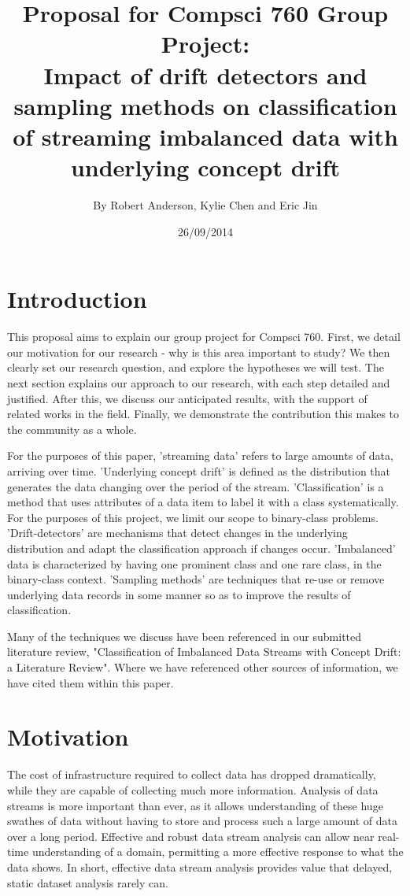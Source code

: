 \documentclass[11pt]{article}\usepackage[]{graphicx}\usepackage[]{color}
\title{\textbf{Proposal for Compsci 760 Group Project:} \\
Impact of drift detectors and sampling methods on classification of streaming imbalanced data with underlying concept drift}
\author{By Robert Anderson, Kylie Chen and Eric Jin}
\date{26/09/2014}
\begin{document}
\maketitle


\section{Introduction}

This proposal aims to explain our group project for Compsci 760. First, we detail our motivation for our research - why is this area important to study? We then clearly set our research question, and explore the hypotheses we will test. The next section explains our approach to our research, with each step detailed and justified. After this, we discuss our anticipated results, with the support of related works in the field. Finally, we demonstrate the contribution this makes to the community as a whole.

For the purposes of this paper, 'streaming data' refers to large amounts of data, arriving over time. 'Underlying concept drift' is defined as the distribution that generates the data changing over the period of the stream. 'Classification' is a method that uses attributes of a data item to label it with a class systematically. For the purposes of this project, we limit our scope to binary-class problems. 'Drift-detectors' are mechanisms that detect changes in the underlying distribution and adapt the classification approach if changes occur. 'Imbalanced' data is characterized by having one prominent class and one rare class, in the binary-class context.  'Sampling methods' are techniques that re-use or remove underlying data records in some manner so as to improve the results of classification.

Many of the techniques we discuss have been referenced in our submitted literature review, "Classification of Imbalanced Data Streams with Concept Drift: a Literature Review". Where we have referenced other sources of information, we have cited them within this paper.

\section{Motivation}

The cost of infrastructure required to collect data has dropped dramatically, while they are capable of collecting much more information. Analysis of data streams is more important than ever, as it allows understanding of these huge swathes of data without having to store and process such a large amount of data over a long period. Effective and robust data stream analysis can allow near real-time understanding of a domain, permitting a more effective response to what the data shows. In short, effective data stream analysis provides value that delayed, static dataset analysis rarely can.
\end{document}
